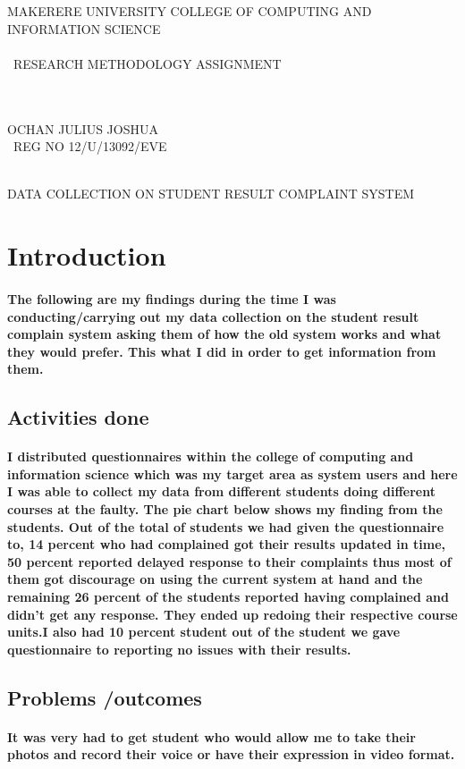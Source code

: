 \documentclass[10pt]{report}
\begin{document}
\author{}
MAKERERE UNIVERSITY COLLEGE OF COMPUTING AND INFORMATION SCIENCE
\\\
\\\
RESEARCH METHODOLOGY ASSIGNMENT
\\\
\\\
\author{}
OCHAN JULIUS JOSHUA
\\\ 
REG NO 12/U/13092/EVE
\\\

\title{}
DATA COLLECTION ON STUDENT RESULT COMPLAINT SYSTEM
\section{Introduction}

\paragraph{The following are my findings during the time I was conducting/carrying out my data collection on the student result complain system asking them of how the old system works and what they would prefer. This what I did in order to get information from them.}
\subsection{Activities  done}
\paragraph{I distributed questionnaires within the college of computing and information science which was my target area as system users and here I was able to collect my data from different students doing different courses at the faulty. The pie chart below shows my finding from the students.
Out of the total of students we had given the questionnaire to, 14 percent who had complained got their results updated in time, 50 percent reported delayed response to their complaints thus most of them got discourage on using the current system at hand and the remaining 26 percent of the students reported having complained and didn't get any response. They ended up redoing their respective course units.I also had 10 percent student out of the student we gave questionnaire to reporting no issues with their results.
}
\subsection{Problems /outcomes}
\paragraph{It was very had to get student who would allow me to take their photos and record their voice or have their expression in video format.\\
}
\end{document}
